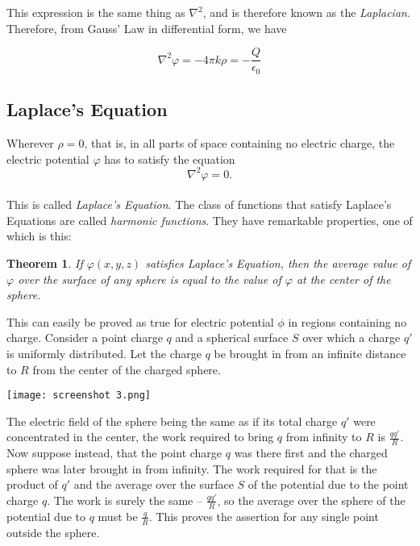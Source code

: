 \documentclass[svgnames]{article}
\newtheorem{theorem}{Theorem}		        %
\begin{document}
This expression is the same thing as $\nabla^2$, and is therefore known as the \textit{Laplacian}. \\

Therefore, from Gauss' Law in differential form, we have 

\[ \nabla^2 \varphi = -4\pi k \rho = -\frac{Q}{\epsilon_0} \] 


\subsection{Laplace's Equation}

Wherever $\rho = 0 $, that is, in all parts of space containing no electric
charge, the electric potential  $\varphi$ has to satisfy the equation \[
\nabla^2 \varphi = 0
.\] \\

This is called \textit{Laplace's Equation}. The class of functions that satisfy
Laplace's Equations are called \textit{harmonic functions}. They have
remarkable properties, one of which is this: 

\begin{theorem}
  If $\varphi(x,y,z)$ satisfies Laplace's Equation, then the average value of
  $\varphi$ over the surface of any sphere is equal to the value of $\varphi$
  at the center of the sphere.
\end{theorem}

This can easily be proved as true for electric potential $\phi$ in regions
containing no charge. Consider a point charge $q$ and a spherical surface $S$
over which a charge $q'$ is uniformly distributed. Let the charge $q$ be
brought in from an infinite distance to  $R$ from the center of the charged
sphere. 

\begin{center}
\texttt{[image: screenshot 3.png]}
\end{center}

The electric field of the sphere being the same as if its total charge $q'$
were concentrated in the center, the work required to bring $q$ from infinity
to $R$ is $\frac{qq'}{R}$. Now suppose instead, that the point charge $q$ was
there first and the charged sphere was later brought in from infinity. The work
required for that is the product of $q'$ and the average over the surface $S$
of the potential due to the point charge $q$. The work is surely the same --
$\frac{qq'}{R}$, so the average over the sphere of the potential due to $q$
must be $\frac{q}{R}$. This proves the assertion for any single point outside
the sphere. 
\end{document}
